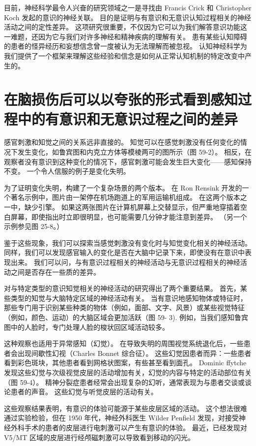 目前，神经科学最令人兴奋的研究领域之一是寻找由 Francis Crick 和 Christopher Koch 发起的意识的神经关联。 目的是证明与有意识和无意识认知过程相关的神经活动之间的定性差异。 这项研究很重要，不仅因为它可以为我们解答意识功能这一难题，还因为它与我们对许多神经和精神疾病的理解有关。 患有某些认知障碍的患者的怪异经历和妄想信念曾一度被认为无法理解而被忽视。 认知神经科学为我们提供了一个框架来理解这些经验和信念是如何从正常认知机制的特定改变中产生的。


\section{在脑损伤后可以以夸张的形式看到感知过程中的有意识和无意识过程之间的差异}

感官刺激和知觉之间的关系远非直接的。 知觉可以在感觉刺激没有任何变化的情况下发生变化，如鲁宾图和内克立方体等模棱两可的图所示（图 59-2）。 相反，在观察者没有意识到这种变化的情况下，感官刺激可能会发生巨大变化——感知保持不变。 一个令人信服的例子是变化失明。

为了证明变化失明，构建了一个复杂场景的两个版本。 在 Ron Rensink 开发的一个著名示例中，图片由一架停在机场跑道上的军用运输机组成。 在这两个版本之一中，缺少引擎。 如果这两张图片在计算机屏幕上交替显示，但严重地穿插着空白屏幕，即使指出时立即很明显，也可能需要几分钟才能注意到差异。 （另一个示例参见图 25-8。）

鉴于这些现象，我们可以探索当感觉刺激没有变化时与知觉变化相关的神经活动。 同样，我们可以发现感官输入的变化是否在大脑中记录下来，即使没有在意识中表现出来。 我们可以问，与有意识过程相关的神经活动与无意识过程相关的神经活动之间是否存在一些质的差异。

对与特定类型的意识知觉相关的神经活动的研究得出了两个重要结果。 首先，某些类型的知觉与大脑特定区域的神经活动有关。 当有意识地感知物体或特征时，那些专门用于识别某些种类的物体（例如，面部、文字、风景）或某些视觉特征（例如，颜色、运动）的大脑区域会更加活跃（图 59- 3). 例如，当我们感知鲁宾图中的人脸时，专门处理人脸的梭状回区域活动较多。

这种观察也适用于异常感知（幻觉）。 在导致失明的周围视觉系统退化后，一些患者会出现间歇性幻视（Charles Bonnet 综合征）。 这些幻觉因患者而异：一些患者看到彩色斑块，其他患者看到网格状图案，有些甚至看到面孔。 Dominic ffytche 发现这些幻觉与次级视觉皮层的活动增加有关，幻觉的内容与特定的活动部位有关（图 59-4）。 精神分裂症患者经常会出现复杂的幻听，通常表现为与患者交谈或谈论患者的声音。 这些幻觉与听觉皮层的活动有关。

这些观察结果表明，有意识的体验可能源于某些皮层区域的活动。 这个想法很难通过实验检验，但在 1950 年代，神经外科医生 Wilder Penfield 发现，对接受神经外科手术的患者的皮层进行电刺激可以产生有意识的体验。 最近，已经发现对 V5/MT 区域的皮层进行经颅磁刺激可以导致看到移动的闪光。

